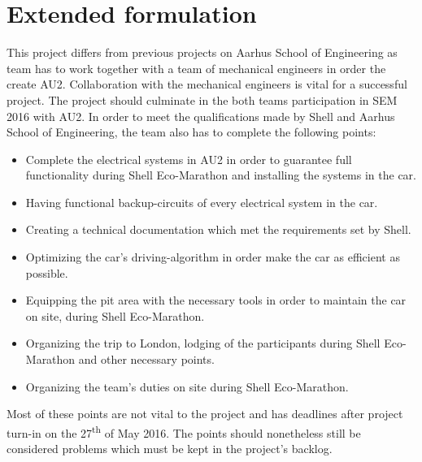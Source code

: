 \section{Extended formulation}
This project differs from previous projects on Aarhus School of Engineering as team has to work together with a team of mechanical engineers in order the create AU2. Collaboration with the mechanical engineers is vital for a successful project. The project should culminate in the both teams participation in SEM 2016 with AU2. In order to meet the qualifications made by Shell and Aarhus School of Engineering, the team also has to complete the following points:
\begin{itemize}
	\item Complete the electrical systems in AU2 in order to guarantee full functionality during Shell Eco-Marathon and installing the systems in the car.
	\item Having functional backup-circuits of every electrical system in the car.
	\item Creating a technical documentation which met the requirements set by Shell.
	\item Optimizing the car's driving-algorithm in order make the car as efficient as possible.
	\item Equipping the pit area with the necessary tools in order to maintain the car on site, during Shell Eco-Marathon.
	\item Organizing the trip to London, lodging of the participants during Shell Eco-Marathon and other necessary points.
	\item Organizing the team's duties on site during Shell Eco-Marathon.
\end{itemize}
Most of these points are not vital to the project and has deadlines after project turn-in on the 27\textsuperscript{th} of May 2016. The points should nonetheless still be considered problems which must be kept in the project's backlog.